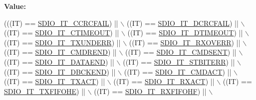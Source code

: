 {\bfseries Value\+:}
\begin{DoxyCode}
(((IT)  == \hyperlink{group___s_d_i_o___interrupt__sources_gabb076105e18355a260c40a379511e72f}{SDIO\_IT\_CCRCFAIL}) || \(\backslash\)
                            ((IT)  == \hyperlink{group___s_d_i_o___interrupt__sources_gaf3321305cb4e24419185a4b92ead299a}{SDIO\_IT\_DCRCFAIL}) || \(\backslash\)
                            ((IT)  == \hyperlink{group___s_d_i_o___interrupt__sources_ga3c2fdef0993f10e65d4fddbdf71febed}{SDIO\_IT\_CTIMEOUT}) || \(\backslash\)
                            ((IT)  == \hyperlink{group___s_d_i_o___interrupt__sources_gaf5ce4bfa8459ccbe892791e5cdc26a6f}{SDIO\_IT\_DTIMEOUT}) || \(\backslash\)
                            ((IT)  == \hyperlink{group___s_d_i_o___interrupt__sources_ga93d4dbe3162b8507b2834a3e29e6c648}{SDIO\_IT\_TXUNDERR}) || \(\backslash\)
                            ((IT)  == \hyperlink{group___s_d_i_o___interrupt__sources_ga272953292e1b43b2108b00e75db76512}{SDIO\_IT\_RXOVERR}) || \(\backslash\)
                            ((IT)  == \hyperlink{group___s_d_i_o___interrupt__sources_ga6df3bb694dc00e250cd22e16a03d6910}{SDIO\_IT\_CMDREND}) || \(\backslash\)
                            ((IT)  == \hyperlink{group___s_d_i_o___interrupt__sources_gaf9d8fc4651c4b7555fb9ee4e5af6ca63}{SDIO\_IT\_CMDSENT}) || \(\backslash\)
                            ((IT)  == \hyperlink{group___s_d_i_o___interrupt__sources_ga6cc1c521b64fc57b844336f7f175dd1e}{SDIO\_IT\_DATAEND}) || \(\backslash\)
                            ((IT)  == \hyperlink{group___s_d_i_o___interrupt__sources_ga55f7e65ed1b70d5a6abdc3cc41b55766}{SDIO\_IT\_STBITERR}) || \(\backslash\)
                            ((IT)  == \hyperlink{group___s_d_i_o___interrupt__sources_gaa1b1fb453a3ce3b10928aaeada2b2186}{SDIO\_IT\_DBCKEND}) || \(\backslash\)
                            ((IT)  == \hyperlink{group___s_d_i_o___interrupt__sources_gae73ae9bc72eaeedc2a37221697bc33e2}{SDIO\_IT\_CMDACT}) || \(\backslash\)
                            ((IT)  == \hyperlink{group___s_d_i_o___interrupt__sources_ga811e683588ab887abb0101defafdb51e}{SDIO\_IT\_TXACT}) || \(\backslash\)
                            ((IT)  == \hyperlink{group___s_d_i_o___interrupt__sources_ga1d9a59a2415b57bdf9827423cb6ce3a0}{SDIO\_IT\_RXACT}) || \(\backslash\)
                            ((IT)  == \hyperlink{group___s_d_i_o___interrupt__sources_gaf538ae7dd73d55e76069e8710858038a}{SDIO\_IT\_TXFIFOHE}) || \(\backslash\)
                            ((IT)  == \hyperlink{group___s_d_i_o___interrupt__sources_gadcbc1a0de8b9df83b5c6c839b4739c87}{SDIO\_IT\_RXFIFOHF}) || \(\backslash\)

\end{DoxyCode}
